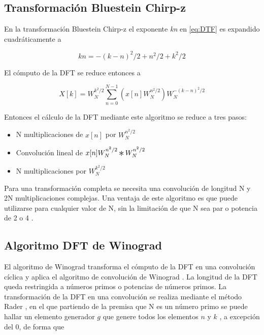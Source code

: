 \subsection{Transformación Bluestein Chirp-z}

En la transformación Bluestein Chirp-z el exponente \textit{kn} en \ref{eq:DTF} es expandido
cuadráticamente a 

\begin{equation}
	kn = -(k-n)^2/2 + n^2/2 + k^2/2  
\label{eq:chirp1}
\end{equation}

El cómputo de la DFT se reduce entonces a

\begin{equation}
	X[k] = W_{N}^{k^2/2}\sum_{n=0}^{N-1}(x[n]W_{N}^{n^2/2})W_{N}^{-(k-n)^2/2}  
\label{eq:goertz2}
\end{equation}

Entonces el cálculo de la DFT mediante este algoritmo se reduce a tres pasos:

\newcommand{\Conv}{\mathop{\scalebox{1.5}{\raisebox{-0.2ex}{$\ast$}}}}

\begin{itemize}
  \item N multiplicaciones de $x[n]$ por $W_{N}^{n^2/2}$
  \item Convolución lineal de $x[n]W_{N}^{n^2/2} \Conv W_{N}^{n^2/2}$
  \item N multiplicaciones por $W_{N}^{k^2/2}$
\end{itemize}

Para una transformación completa se necesita una convolución de longitud N y 2N multiplicaciones
complejas. Una ventaja de este algoritmo es que puede utilizarse para cualquier valor de N, sin la
limitación de que N sea par o potencia de 2 o 4 \cite{meyer_CZT}.

\subsection{Algoritmo DFT de Winograd}

El algoritmo de Winograd transforma el cómputo de la DFT en una convolución cíclica y aplica el
algoritmo de convolución de Winograd \cite{WinoConv}. La longitud de la DFT queda
restringida a números primos o potencias de números primos.
La transformación de la DFT en una convolución se realiza mediante el método Rader \cite{Rader}, en
el que partiendo de la premisa que N es un número primo se puede hallar un elemento generador
$g$ que genere todos los elementos $n$ y $k$ \cite{gener}, a excepción del $0$,  de forma que

